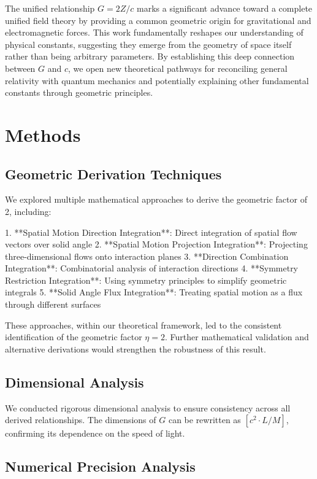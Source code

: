 \documentclass[12pt,twocolumn]{article}
\begin{document}
The unified relationship $G = 2Z/c$ marks a significant advance toward a complete unified field theory by providing a common geometric origin for gravitational and electromagnetic forces. This work fundamentally reshapes our understanding of physical constants, suggesting they emerge from the geometry of space itself rather than being arbitrary parameters. By establishing this deep connection between $G$ and $c$, we open new theoretical pathways for reconciling general relativity with quantum mechanics and potentially explaining other fundamental constants through geometric principles.

\section*{Methods}

\subsection{Geometric Derivation Techniques}

We explored multiple mathematical approaches to derive the geometric factor of 2, including:

1. **Spatial Motion Direction Integration**: Direct integration of spatial flow vectors over solid angle
2. **Spatial Motion Projection Integration**: Projecting three-dimensional flows onto interaction planes
3. **Direction Combination Integration**: Combinatorial analysis of interaction directions
4. **Symmetry Restriction Integration**: Using symmetry principles to simplify geometric integrals
5. **Solid Angle Flux Integration**: Treating spatial motion as a flux through different surfaces

These approaches, within our theoretical framework, led to the consistent identification of the geometric factor $\eta = 2$. Further mathematical validation and alternative derivations would strengthen the robustness of this result.

\subsection{Dimensional Analysis}

We conducted rigorous dimensional analysis to ensure consistency across all derived relationships. The dimensions of $G$ can be rewritten as $[c^2 \cdot L/M]$, confirming its dependence on the speed of light.

\subsection{Numerical Precision Analysis}
\end{document}
